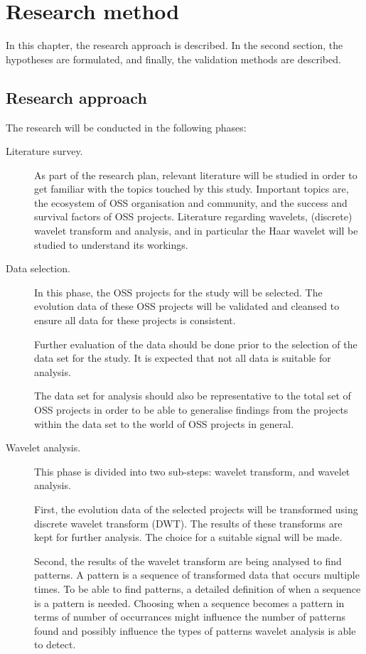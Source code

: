 \chapter{Research method}
\label{method}

In this chapter, the research approach is described. In the second section, the
hypotheses are formulated, and finally, the validation methods are described.

\section{Research approach}
The research will be conducted in the following phases:
\begin{description}
	\item[Literature survey.] As part of the research plan, relevant literature
	will be studied in order to get familiar with the topics touched by this
	study. Important topics are, the ecosystem of OSS organisation and community,
	and the success and survival factors of OSS projects. Literature regarding
	wavelets, (discrete) wavelet transform and analysis, and in particular the
	Haar wavelet will be studied to understand its workings.

	\item[Data selection.] In this phase, the OSS projects for the study will be
	selected. The evolution data of these OSS projects will be validated and
	cleansed to ensure all data for these projects is consistent.

	Further evaluation of the data should be done prior to the selection of the
	data set for the study. It is expected that not all data is suitable for
	analysis.

	The data set for analysis should also be representative to the total set of
	OSS projects in order to be able to generalise findings from the
	projects within the data set to the world of OSS projects in general.
	
	\item[Wavelet analysis.] This phase is divided into two sub-steps: wavelet
	transform, and wavelet analysis.
	
	First, the evolution data of the selected projects will be transformed using
	discrete wavelet transform (DWT). The results of these transforms are kept for
	further analysis. The choice for a suitable signal will be made.
	
	Second, the results of the wavelet transform are being analysed to find
	patterns. A pattern is a sequence of transformed data that occurs multiple
	times. To be able to find patterns, a detailed definition of when a sequence
	is a pattern is needed. Choosing when a sequence becomes a pattern in terms of
	number of occurrances might influence the number of patterns found and
	possibly influence the types of patterns wavelet analysis is able to detect.
	

\end{description}
